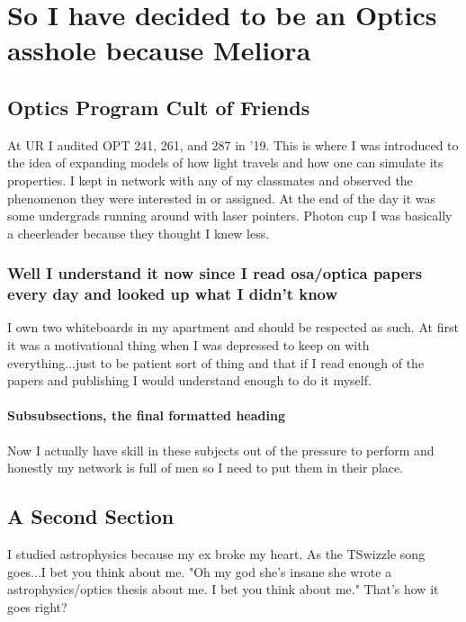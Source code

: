 \chapter{So I have decided to be an Optics asshole because Meliora}



\section[Shorter Title]{Optics Program Cult of Friends}

At UR I audited OPT 241, 261, and 287 in '19. This is where I was introduced to the idea of expanding models of how light travels and how one can simulate its properties. I kept in network with any of my classmates and observed the phenomenon they were interested in or assigned. At the end of the day it was some undergrads running around with laser pointers. Photon cup I was basically a cheerleader because they thought I knew less.  

\subsection{Well I understand it now since I read osa/optica papers every day and looked up what I didn't know}

I own two whiteboards in my apartment and should be respected as such. At first it was a motivational thing when I was depressed to keep on with everything...just to be patient sort of thing and that if I read enough of the papers and publishing I would understand enough to do it myself. 

\subsubsection{Subsubsections, the final formatted heading}

Now I actually have skill in these subjects out of the pressure to perform and honestly my network is full of men so I need to put them in their place. 

\section{A Second Section}

I studied astrophysics because my ex broke my heart. As the TSwizzle song goes...I bet you think about me. "Oh my god she's insane she wrote a astrophysics/optics thesis about me. I bet you think about me." That's how it goes right?